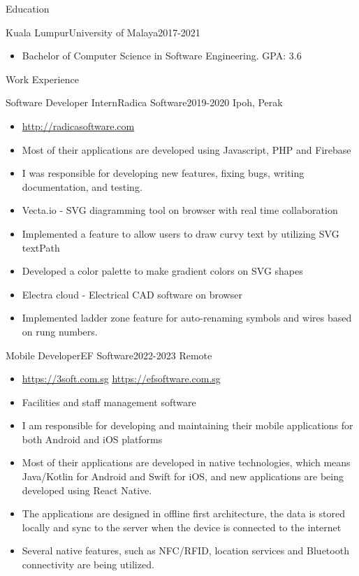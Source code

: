 \documentclass[]{mcdowellcv}
\begin{document}
\makeheader


\begin{cvsection}{Education}
	\begin{cvsubsection}{Kuala Lumpur}{University of Malaya}{2017-2021}
		\begin{itemize}
			\item Bachelor of Computer Science in Software Engineering. GPA: 3.6
		\end{itemize}
	\end{cvsubsection}
\end{cvsection}
\begin{cvsection}{Work Experience}
	\begin{cvsubsection}{Software Developer Intern}{Radica Software}{2019-2020}
		Ipoh, Perak
		\begin{itemize}%
			\item \url{http://radicasoftware.com}
			\item Most of their applications are developed using Javascript, PHP and Firebase
			\item I was responsible for developing new features, fixing bugs, writing documentation, and testing.
			\item Vecta.io - SVG diagramming tool on browser with real time collaboration
			\item Implemented a feature to allow users to draw curvy text by utilizing SVG textPath
			\item Developed a color palette to make gradient colors on SVG shapes
			\item Electra cloud - Electrical CAD software on browser
			\item Implemented ladder zone feature for auto-renaming symbols and wires based on rung numbers.
		\end{itemize}
	\end{cvsubsection}
	\begin{cvsubsection}{Mobile Developer}{EF Software}{2022-2023}
		Remote
		\begin{itemize}%
			\item \url{https://3soft.com.sg} \quad\url{https://efsoftware.com.sg}
			\item Facilities and staff management software
			\item I am responsible for developing and maintaining their mobile applications for both Android and iOS platforms
			\item Most of their applications are developed in native technologies, which means Java/Kotlin for Android and Swift for iOS, and new applications are being developed using React Native.
			\item The applications are designed in offline first architecture, the data is stored locally and sync to the server when the device is connected to the internet
			\item Several native features, such as NFC/RFID, location services and Bluetooth connectivity are being utilized.
		\end{itemize}
	\end{cvsubsection}
\end{cvsection}
\end{document}
